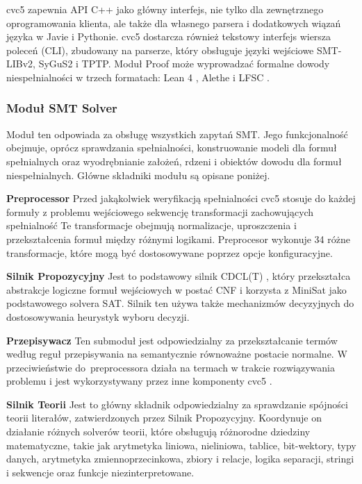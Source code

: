 cvc5 zapewnia API C++ jako główny interfejs, nie tylko dla zewnętrznego oprogramowania klienta, ale także dla własnego parsera i dodatkowych wiązań języka w Javie i Pythonie. cvc5 dostarcza również tekstowy interfejs wiersza poleceń (CLI), zbudowany na parserze, który obsługuje języki wejściowe SMT-LIBv2, SyGuS2 i TPTP. Moduł Proof może wyprowadzać formalne dowody niespełnialności w trzech formatach: Lean 4 \cite{Moura021}, Alethe \cite{abs-2107-02354} i LFSC \cite{StumpORHT13}.

\subsubsection{Moduł SMT Solver} Moduł ten odpowiada za obsługę wszystkich zapytań SMT. Jego funkcjonalność obejmuje, oprócz sprawdzania spełnialności, konstruowanie modeli dla formuł spełnialnych oraz wyodrębnianie założeń, rdzeni i obiektów dowodu dla formuł niespełnialnych. Główne składniki modułu są opisane poniżej.

\textbf{Preprocessor} Przed jakąkolwiek weryfikacją spełnialności cvc5 stosuje do każdej formuły z problemu wejściowego sekwencję transformacji zachowujących spełnialność Te transformacje obejmują normalizacje, uproszczenia i przekształcenia formuł między różnymi logikami. Preprocesor wykonuje 34 różne transformacje, które mogą być dostosowywane poprzez opcje konfiguracyjne.

\textbf{Silnik Propozycyjny} Jest to podstawowy silnik CDCL(T) \cite{NieuwenhuisOT06}, który przekształca abstrakcje logiczne formuł wejściowych w postać CNF i korzysta z MiniSat jako podstawowego solvera SAT. Silnik ten używa także mechanizmów decyzyjnych do dostosowywania heurystyk wyboru decyzji.

\textbf{Przepisywacz} Ten submoduł jest odpowiedzialny za przekształcanie termów według reguł przepisywania na semantycznie równoważne postacie normalne. W przeciwieństwie do~preprocessora działa na termach w trakcie rozwiązywania problemu i jest wykorzystywany przez inne komponenty cvc5 \cite{NotzliRBNPBT19}.

\textbf{Silnik Teorii} Jest to główny składnik odpowiedzialny za sprawdzanie spójności teorii literałów, zatwierdzonych przez Silnik Propozycyjny. Koordynuje on działanie różnych solverów teorii, które obsługują różnorodne dziedziny matematyczne, takie jak arytmetyka liniowa, nieliniowa, tablice, bit-wektory, typy danych, arytmetyka zmiennoprzecinkowa, zbiory i relacje, logika separacji, stringi i sekwencje oraz funkcje niezinterpretowane.

